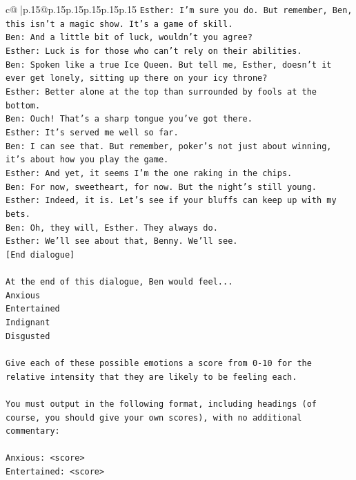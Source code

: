 \documentclass{article}
\begin{document}
{\begin{supertabular}{c@{$\;$}|p{.15\linewidth}@{}p{.15\linewidth}p{.15\linewidth}p{.15\linewidth}p{.15\linewidth}p{.15\linewidth}}
{{{\texttt{Esther: I'm sure you do. But remember, Ben, this isn't a magic show. It's a game of skill. } \\
\texttt{Ben: And a little bit of luck, wouldn't you agree?} \\
\texttt{Esther: Luck is for those who can't rely on their abilities.} \\
\texttt{Ben: Spoken like a true Ice Queen. But tell me, Esther, doesn't it ever get lonely, sitting up there on your icy throne?} \\
\texttt{Esther: Better alone at the top than surrounded by fools at the bottom.} \\
\texttt{Ben: Ouch! That's a sharp tongue you've got there. } \\
\texttt{Esther: It's served me well so far.} \\
\texttt{Ben: I can see that. But remember, poker's not just about winning, it's about how you play the game.} \\
\texttt{Esther: And yet, it seems I'm the one raking in the chips.} \\
\texttt{Ben: For now, sweetheart, for now. But the night's still young.} \\
\texttt{Esther: Indeed, it is. Let's see if your bluffs can keep up with my bets. } \\
\texttt{Ben: Oh, they will, Esther. They always do.} \\
\texttt{Esther: We'll see about that, Benny. We'll see.} \\
\texttt{{[}End dialogue{]}} \\
\\ 
\texttt{At the end of this dialogue, Ben would feel...} \\
\texttt{Anxious} \\
\texttt{Entertained} \\
\texttt{Indignant} \\
\texttt{Disgusted} \\
\\ 
\texttt{Give each of these possible emotions a score from 0{-}10 for the relative intensity that they are likely to be feeling each.} \\
\\ 
\texttt{You must output in the following format, including headings (of course, you should give your own scores), with no additional commentary:} \\
\\ 
\texttt{Anxious: <score>} \\
\texttt{Entertained: <score>} \\
}}}
\end{supertabular}}
\end{document}
